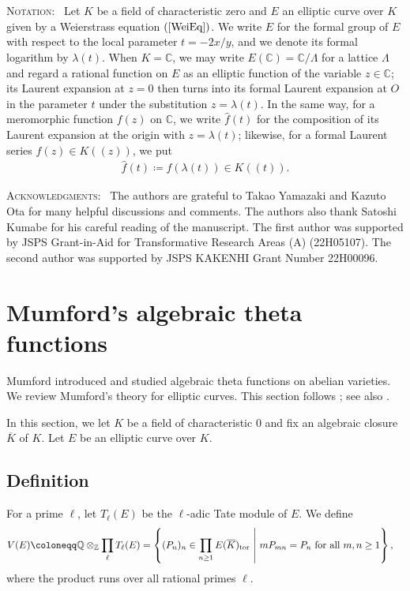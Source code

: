 \documentclass[11pt]{amsart}
\theoremstyle{definition}
\begin{document}
\vspace{10pt}
\noindent
\textsc{Notation:}~ Let $K$ be a field of characteristic zero and $E$ an
elliptic curve over $K$ given by a Weierstrass equation $(\ref{WeiEq})$.
We write $\hat{E}$ for the formal group of $E$ with respect to the local
parameter $t=-2x/y$, and we denote its formal logarithm by $\lambda(t)$.
When $K=\mathbb{C}$, we may write $E(\mathbb{C})=\mathbb{C}/\Lambda$ for a
lattice $\Lambda$ and regard a rational function on $E$ as an elliptic
function of the variable $z \in \mathbb{C}$; its Laurent expansion at
$z=0$ then turns into its formal Laurent expansion at $O$ in the parameter
$t$ under the substitution $z=\lambda(t)$.
In the same way, for a meromorphic function $f(z)$ on $\mathbb{C}$, we
write $\hat{f}(t)$ for the composition of its Laurent expansion at the
origin with $z=\lambda(t)$; likewise, for a formal Laurent series
$f(z) \in K((z))$, we put
%
\begin{align*}
\hat{f}(t) \coloneqq f(\lambda(t)) \in K((t)).
\end{align*}%

\vspace{10pt}
\noindent
\textsc{Acknowledgments:}~ The authors are grateful to Takao Yamazaki and Kazuto Ota for many helpful discussions and comments. The authors also thank Satoshi Kumabe for his careful reading of the manuscript.
The first author was supported by JSPS Grant-in-Aid for Transformative Research Areas (A) (22H05107). The second author was supported by JSPS KAKENHI Grant Number 22H00096.

\section{Mumford's algebraic theta functions}


Mumford introduced and studied algebraic theta functions on abelian varieties.
We review Mumford's theory for elliptic curves. This section follows \cite{BK10}; see also \cite{Mu91}.

In this section, we let $K$ be a field of characteristic $0$ and fix an algebraic closure $\overline{K}$ of $K$. Let $E$ be an elliptic curve over $K$.

\subsection{Definition}
For a prime $\ell$, let $T_\ell (E)$ be the $\ell$-adic Tate module of $E$. We define
%
\begin{align*}
V(E) &\coloneqq \mathbb{Q} \otimes_{\mathbb{Z}} \prod_{\ell} T_{\ell}(E) 
=\left\{(P_n)_n \in \prod_{n \geq 1} E(\overline{K})_{\rm tor} \ \middle| \ mP_{mn}=P_n \text{ for all } m, n \geq 1 \right\},
\end{align*}
%
where the product runs over all rational primes $\ell$.
\end{document}
